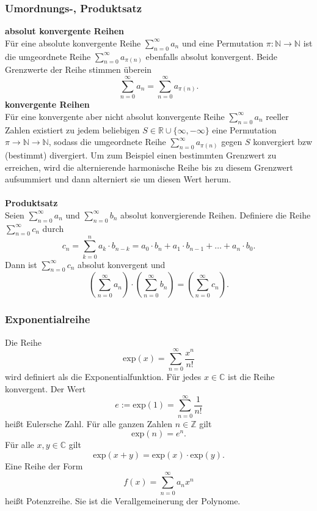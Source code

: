 \documentclass[a4paper,12pt]{article}
\begin{document}
\subsubsection{Umordnungs-, Produktsatz}
\textbf{absolut konvergente Reihen}\\ 
Für eine absolute konvergente Reihe $\sum_{n=0}^{\infty}a_n$ und eine Permutation $\pi :\mathbb{N}\rightarrow \mathbb{N}$ ist die umgeordnete Reihe $\sum_{n=0}^{\infty}a_{\pi \left(n\right)}$ ebenfalls absolut konvergent. Beide Grenzwerte der Reihe stimmen überein
\[ 
        \sum_{n=0}^{\infty}a_n=\sum_{n=0}^{\infty}a_{\pi \left(n\right)}
.\] 
\textbf{konvergente Reihen}\\ 
Für eine konvergente aber nicht absolut konvergente Reihe $\sum_{n=0}^{\infty}a_n$ reeller Zahlen existiert zu jedem beliebigen $S \in \mathbb{R}\cup \{\infty,-\infty\}$ eine Permutation $\pi \rightarrow \mathbb{N}\rightarrow \mathbb{N}$, sodass die umgeordnete Reihe $\sum_{n=0}^{\infty}a_{\pi \left(n\right)}$ gegen $S$ konvergiert bzw (bestimmt) divergiert. Um zum Beispiel einen bestimmten Grenzwert zu erreichen, wird die alternierende harmonische Reihe bis zu diesem Grenzwert aufsummiert und dann \glqq alterniert sie um diesen Wert herum\grqq.
\\\hfill\\\textbf{Produktsatz}\\ 
Seien $\sum_{n=0}^{\infty}a_n$ und $\sum_{n=0}^{\infty}b_n$ absolut konvergierende Reihen. Definiere die Reihe $\sum_{n=0}^{\infty}c_n$ durch
\[ 
        c_n=\sum_{k=0}^{n}a_k\cdot b_{n-k}=a_0\cdot b_n+a_1\cdot b_{n-1}+\hdots+a_n\cdot b_0
.\] 
Dann ist $\sum_{n=0}^{\infty}c_n$ absolut konvergent und
\[ 
        \left(\sum_{n=0}^{\infty}a_n\right)\cdot \left(\sum_{n=0}^{\infty}b_n\right)=\left(\sum_{n=0}^{\infty}c_n\right)
.\] 

\subsubsection{Exponentialreihe}
Die Reihe
\[ 
        \text{exp}\left(x\right)=\sum_{n=0}^{\infty}\dfrac{x^{n}}{n!}
\] 
wird definiert als die Exponentialfunktion. Für jedes $x \in \mathbb{C}$ ist die Reihe konvergent. Der Wert
\[ 
        e:=\text{exp}\left(1\right)=\sum_{n=0}^{\infty}\dfrac{1}{n!}
\] 
heißt Eulersche Zahl. Für alle ganzen Zahlen $n  \in \mathbb{Z}$ gilt
\[ 
        \text{exp}\left(n\right)=e^{n}
.\] 
Für alle $x,y \in \mathbb{C}$ gilt
\[ 
        \text{exp}\left(x+y\right)=\text{exp}\left(x\right)\cdot \text{exp}\left(y\right)
.\] 
Eine Reihe der Form 
\[ 
        f\left(x\right)=\sum_{n=0}^{\infty}a_nx^{n}
\] 
heißt Potenzreihe. Sie ist die Verallgemeinerung der Polynome.
\end{document}
